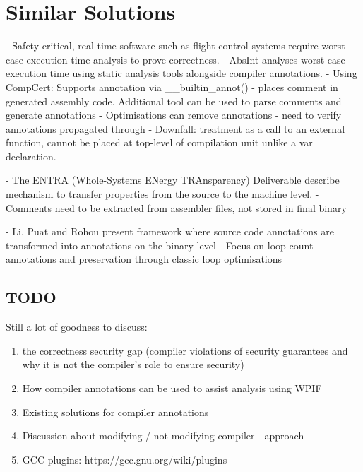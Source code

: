 \documentclass[twocolumn]{article}
\begin{document}
\section{Similar Solutions}
- Safety-critical, real-time software such as flight control systems require worst-case execution time analysis to prove correctness.
-  AbsInt analyses worst case execution time using static analysis tools alongside compiler annotations.
- Using CompCert: Supports annotation via \_\_builtin\_annot() - places comment in generated assembly code. Additional tool can be used to parse comments and generate annotations
- Optimisations can remove annotations - need to verify annotations propagated through
- Downfall: treatment as a call to an external function, cannot be placed at top-level of compilation unit unlike a var declaration.

- The ENTRA (Whole-Systems ENergy TRAnsparency) Deliverable describe mechanism to transfer properties from the source to the machine level.
- Comments need to be extracted from assembler files, not stored in final binary

- Li, Puat and Rohou present framework where source code annotations are transformed into annotations on the binary level
- Focus on loop count annotations and preservation through classic loop optimisations


\subsection{TODO}
Still a lot of goodness to discuss:
\begin{enumerate}
    \item the correctness security gap (compiler violations of security guarantees and why it is not the compiler's role to ensure security)
    \item How compiler annotations can be used to assist analysis using WPIF
    \item Existing solutions for compiler annotations
    \item Discussion about modifying / not modifying compiler - approach
    \item GCC plugins: https://gcc.gnu.org/wiki/plugins
\end{enumerate}






\printbibliography
\end{document}

